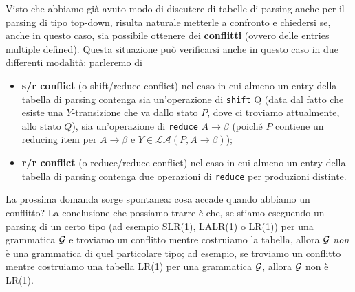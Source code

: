 \documentclass[class=book, crop=false, oneside, 12pt]{standalone}
\begin{document}
Visto che abbiamo già avuto modo di discutere di tabelle di parsing anche per il parsing di tipo top-down, risulta naturale metterle a confronto e chiedersi se, anche in questo caso, sia possibile ottenere dei \textbf{conflitti} (ovvero delle entries multiple defined). Questa situazione può verificarsi anche in questo caso in due differenti modalità: parleremo di
\begin{itemize}
    \item \textbf{s/r conflict} (o shift/reduce conflict) nel caso in cui almeno un entry della tabella di parsing contenga sia un'operazione di \texttt{shift} Q (data dal fatto che esiste una \(Y\)-transizione che va dallo stato \(P\), dove ci troviamo attualmente, allo stato \(Q\)), sia un'operazione di \texttt{reduce} \(A \rightarrow \beta\) (poiché \(P\) contiene un reducing item per \(A \rightarrow \beta\) e \(Y \in \mathcal{LA}(P, A \rightarrow \beta)\));
    \item \textbf{r/r conflict} (o reduce/reduce conflict) nel caso in cui almeno un entry della tabella di parsing contenga due operazioni di \texttt{reduce} per produzioni distinte.
\end{itemize}

La prossima domanda sorge spontanea: cosa accade quando abbiamo un conflitto? La conclusione che possiamo trarre è che, se stiamo eseguendo un parsing di un certo tipo (ad esempio SLR(1), LALR(1) o LR(1)) per una grammatica \(\mathcal{G}\) e troviamo un conflitto mentre costruiamo la tabella, allora \(\mathcal{G}\) \emph{non} è una grammatica di quel particolare tipo; ad esempio, se troviamo un conflitto mentre costruiamo una tabella LR(1) per una grammatica \(\mathcal{G}\), allora \(\mathcal{G}\) non è LR(1).
\end{document}
